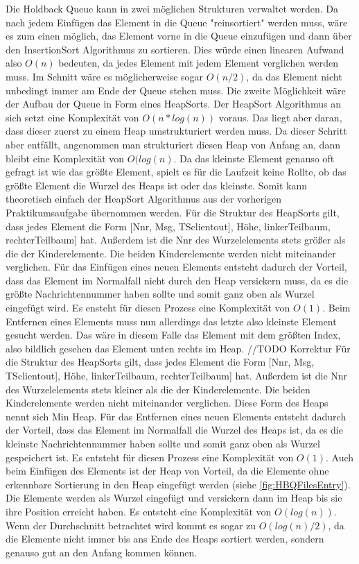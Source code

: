 Die Holdback Queue kann in zwei möglichen Strukturen verwaltet werden. Da nach jedem Einfügen das Element in die Queue "reinsortiert" werden muss, wäre es zum einen möglich, das Element vorne in die Queue einzufügen und dann über den InsertionSort Algorithmus zu sortieren. Dies würde einen linearen Aufwand also $O(n)$ bedeuten, da jedes Element mit jedem Element verglichen werden muss. Im Schnitt wäre es möglicherweise sogar $O(n/2)$, da das Element nicht unbedingt immer am Ende der Queue stehen muss. 
Die zweite Möglichkeit wäre der Aufbau der Queue in Form eines HeapSorts. Der HeapSort Algorithmus an sich setzt eine Komplexität von $O(n*log(n))$ voraus. Das liegt aber daran, dass dieser zuerst zu einem Heap umstrukturiert werden muss. Da dieser Schritt aber entfällt, angenommen man strukturiert diesen Heap von Anfang an, dann bleibt eine Komplexität von $O(log(n)$. Da das kleinste Element genauso oft gefragt ist wie das größte Element, spielt es für die Laufzeit keine Rollte, ob das größte Element die Wurzel des Heaps ist oder das kleinste. Somit kann theoretisch einfach der HeapSort Algorithmus aus der vorherigen Praktikumsaufgabe übernommen werden. 
Für die Struktur des HeapSorts gilt, dass jedes Element die Form {[}Nnr, Msg, TSclientout{]}, Höhe, linkerTeilbaum, rechterTeilbaum] hat. Außerdem ist die Nnr des Wurzelelements stets größer als die der Kinderelemente. Die beiden Kinderelemente werden nicht miteinander verglichen. 
Für das Einfügen eines neuen Elements entsteht dadurch der Vorteil, dass das Element im Normalfall nicht durch den Heap versickern muss, da es die größte Nachrichtennummer haben sollte und somit ganz oben als Wurzel eingefügt wird. Es ensteht für diesen Prozess eine Komplexität von $O(1)$. Beim Entfernen eines Elements muss nun allerdings das letzte also kleinste Element gesucht werden. Das wäre in diesem Falle das Element mit dem größten Index, also bildlich gesehen das Element unten rechts im Heap. 
//TODO Korrektur Für die Struktur des HeapSorts gilt, dass jedes Element die Form {[}Nnr, Msg, TSclientout{]}, Höhe, linkerTeilbaum, rechterTeilbaum] hat. Außerdem ist die Nnr des Wurzelelements stets kleiner als die der Kinderelemente. Die beiden Kinderelemente werden nicht miteinander verglichen. Diese Form des Heaps nennt sich Min Heap. 
Für das Entfernen eines neuen Elements entsteht dadurch der Vorteil, dass das Element im Normalfall die Wurzel des Heaps ist, da es die kleinste Nachrichtennummer haben sollte und somit ganz oben als Wurzel gespeichert ist. Es entsteht für diesen Prozess eine Komplexität von $O(1)$. Auch beim Einfügen des Elements ist der Heap von Vorteil, da die Elemente ohne erkennbare Sortierung in den Heap eingefügt werden (siehe \ref{fig:HBQFilesEntry}). Die Elemente werden als Wurzel eingefügt und versickern dann im Heap bis sie ihre Position erreicht haben. Es entsteht eine Komplexität von $O(log(n))$. Wenn der Durchschnitt betrachtet wird kommt es sogar zu $O(log(n)/2)$, da die Elemente nicht immer bis ans Ende des Heaps sortiert werden, sondern genauso gut an den Anfang kommen können.

